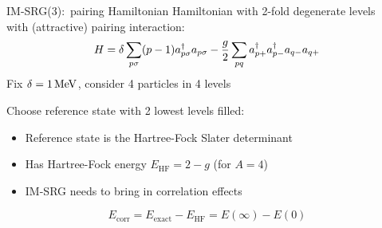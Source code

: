 \documentclass{beamer}
\begin{document}
  \begin{frame}{IM-SRG(3):\ pairing Hamiltonian}
    Hamiltonian with 2-fold degenerate levels \\
    with (attractive) pairing interaction:
    \begin{equation*}
      H = \delta \sum_{p \sigma} (p - 1)a_{p\sigma}^{\dagger} a_{p\sigma}
      - \frac{g}{2} \sum_{pq} a_{p+}^{\dagger}a_{p-}^{\dagger}a_{q-}a_{q+}
    \end{equation*}
    Fix $\delta=1\, \text{MeV}$, consider 4 particles in 4 levels

    Choose reference state with 2 lowest levels filled:
    \begin{itemize}
      \item{Reference state is the Hartree-Fock Slater determinant}
      \item{Has Hartree-Fock energy $E_{\text{HF}} = 2 - g$ (for $A=4$)
        }
      \item{IM-SRG needs to bring in correlation effects}
    \end{itemize}
    \begin{equation*}
      E_{\text{corr}} = E_{\text{exact}} - E_{\text{HF}} = E(\infty) - E(0)
    \end{equation*}
  \end{frame}

\end{document}
